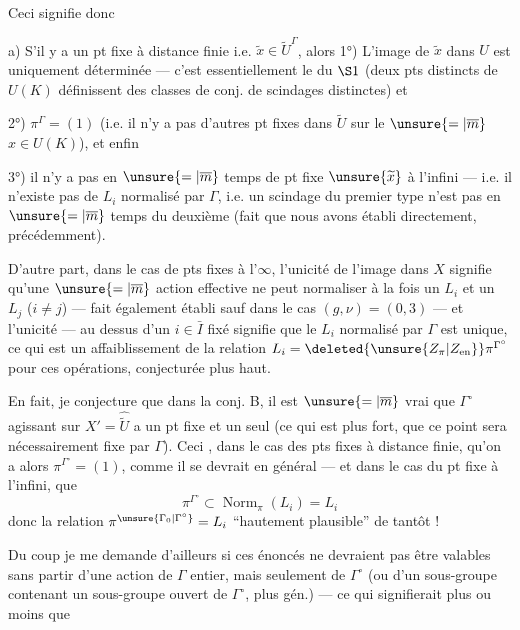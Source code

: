 Ceci signifie donc

a) S'il y a un pt fixe à distance finie i.e. $\widetilde x\in\widetilde U^\Gamma$, alors 1°) L'image de $\widetilde x$ dans $U$ est uniquement déterminée --- c'est essentiellement le  du $\S1$ (deux pts distincts de $U(K)$ définissent des classes de conj. de scindages distinctes) et

2°) $\pi^\Gamma=(1)$ (i.e. il n'y a pas d'autres pt fixes dans $\widetilde U$ sur le $\unsure{=|\overline m}$ $x\in U(K)$), et enfin

3°) il n'y a pas en $\unsure{=|\overline m}$ temps de pt fixe $\unsure{\widetilde x}$ à l'infini --- i.e. il n'existe pas de $L_i$ normalisé par $\Gamma$, i.e. un scindage du premier type n'est pas en $\unsure{=|\overline m}$ temps du deuxième (fait que nous avons établi directement, précédemment).


D'autre part, dans le cas de pts fixes à l'$\infty$, l'unicité de l'image dans $X$ signifie qu'une $\unsure{=|\overline m}$ action effective ne peut normaliser à la fois un $L_i$ et un $L_j$ ($i\ne j$) --- fait également établi sauf dans le cas $(g,\nu)=(0,3)$ --- et l'unicité --- au dessus d'un $i\in\bar I$ fixé signifie que le $L_i$  normalisé par $\Gamma$ est unique, ce qui est un affaiblissement de la relation $L_i=\deleted{\unsure{Z_\pi|Z_{\mathrm{en}}}}\pi^{\Gamma^\circ}$ pour ces opérations, conjecturée plus haut.

En fait, je conjecture que dans la conj. B, il est $\unsure{=|\overline m}$ vrai que $\Gamma^\circ$ agissant sur $X'=\widehat{\widetilde U}$ a un pt fixe et un seul (ce qui est plus fort, que ce point  sera nécessairement fixe par $\Gamma$). Ceci , dans le cas des pts fixes à distance finie, qu'on a alors $\pi^{\Gamma^\circ}=(1)$, comme il se devrait en général --- et dans le cas du pt fixe à l'infini, que
\[
\pi^{\Gamma^\circ}\subset\operatorname{Norm}_{\pi}(L_i)=L_i
\]
donc la relation $\pi^{\unsure{\Gamma_0|\Gamma^\circ}}=L_i$ ``hautement plausible'' de tantôt !

Du coup je me demande d'ailleurs si ces énoncés ne devraient pas être valables sans partir d'une action de $\Gamma$  entier, mais seulement de $\Gamma^\circ$ (ou d'un sous-groupe contenant un sous-groupe ouvert de $\Gamma^\circ$, plus gén.) --- ce qui signifierait plus ou moins que

